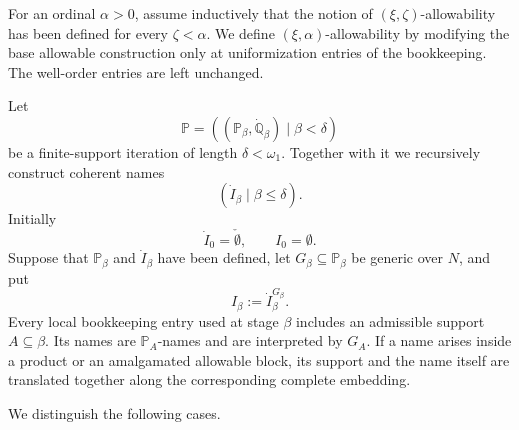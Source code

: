 \documentclass[a4paper,11pt]{article}
\newcommand{\forceP}{\mathbb{P}}
\newcommand{\forceQ}{\mathbb{Q}}
\begin{document}
For an ordinal $\alpha>0$, assume inductively that the notion of $(\xi,\zeta)$-allowability has been defined for every $\zeta<\alpha$. We define $(\xi,\alpha)$-allowability by modifying the base allowable construction only at uniformization entries of the bookkeeping. The well-order entries are left unchanged.

Let
\[
\forceP=((\forceP_\beta,\dot{\forceQ}_\beta)\mid\beta<\delta)
\]
be a finite-support iteration of length $\delta<\omega_1$. Together with it we recursively construct coherent names
\[
(\dot I_\beta\mid\beta\leq\delta).
\]
Initially
\[
\dot I_0=\check\emptyset,
\qquad
I_0=\emptyset.
\]
Suppose that $\forceP_\beta$ and $\dot I_\beta$ have been defined, let $G_\beta\subseteq\forceP_\beta$ be generic over $N$, and put
\[
I_\beta:=\dot I_\beta^{G_\beta}.
\]
Every local bookkeeping entry used at stage $\beta$ includes an admissible support $A\subseteq\beta$. Its names are $\forceP_A$-names and are interpreted by $G_A$. If a name arises inside a product or an amalgamated allowable block, its support and the name itself are translated together along the corresponding complete embedding.

We distinguish the following cases.
\end{document}
